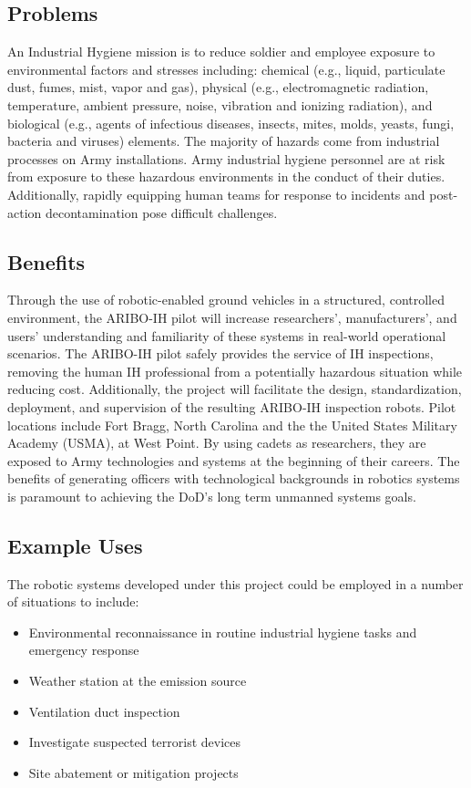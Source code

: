 \subsection{Problems}

An Industrial Hygiene mission is to reduce soldier and employee exposure to environmental factors and stresses including:  chemical (e.g., liquid, particulate dust, fumes, mist, vapor and gas), physical (e.g., electromagnetic radiation, temperature, ambient pressure, noise, vibration and ionizing radiation), and biological (e.g., agents of infectious diseases, insects, mites, molds, yeasts, fungi, bacteria and viruses) elements. The majority of hazards come from industrial processes on Army installations. Army industrial hygiene personnel are at risk from exposure to these hazardous environments in the conduct of their duties. Additionally, rapidly equipping human teams for response to incidents and post-action decontamination pose difficult challenges.  

\subsection{Benefits}

Through the use of robotic-enabled ground vehicles in a structured, controlled environment, the ARIBO-IH pilot will increase researchers’, manufacturers’, and users’ understanding and familiarity of these systems in real-world operational scenarios. The ARIBO-IH pilot safely provides the service of IH inspections, removing the human IH professional from a potentially hazardous situation while reducing cost. Additionally, the project will facilitate the design, standardization, deployment, and supervision of the resulting ARIBO-IH inspection robots. Pilot locations include Fort Bragg, North Carolina and the the United States Military Academy (USMA), at West Point.  By using cadets as researchers, they are exposed to Army technologies and systems at the beginning of their careers. The benefits of generating officers with technological backgrounds in robotics systems is paramount to achieving the DoD’s long term unmanned systems goals.

\subsection{Example Uses}
The robotic systems developed under this project could be employed in a number of situations to include:
\begin{itemize}
	\item Environmental reconnaissance in routine industrial hygiene tasks and emergency response
	\item Weather station at the emission source
	\item Ventilation duct inspection
	\item Investigate suspected terrorist devices
	\item Site abatement or mitigation projects
\end{itemize}

